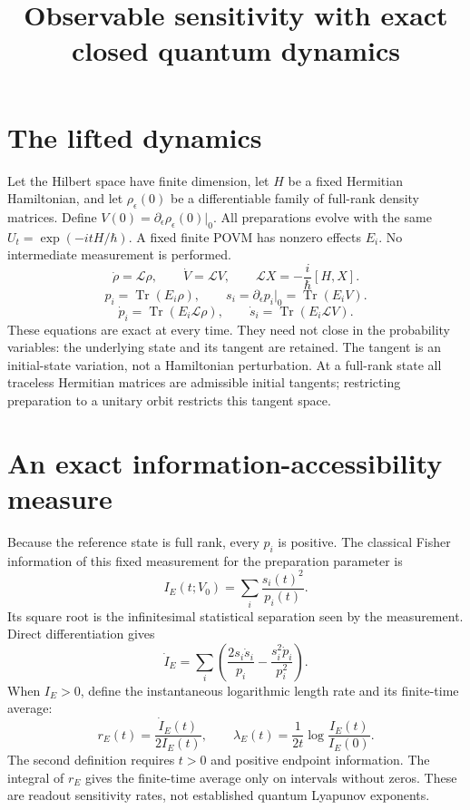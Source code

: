 \documentclass[11pt,a4paper]{article}
\newcommand{\Tr}{\operatorname{Tr}}
\begin{document}
\title{Observable sensitivity with exact closed quantum dynamics}
\author{}
\date{}
\maketitle
\section{The lifted dynamics}
Let the Hilbert space have finite dimension, let $H$ be a fixed Hermitian Hamiltonian, and let $\rho_\epsilon(0)$ be a differentiable family of full-rank density matrices. Define $V(0)=\partial_\epsilon\rho_\epsilon(0)|_0$. All preparations evolve with the same $U_t=\exp(-itH/\hbar)$. A fixed finite POVM has nonzero effects $E_i$. No intermediate measurement is performed.
\[\dot\rho=\mathcal L\rho,\qquad\dot V=\mathcal LV,\qquad\mathcal LX=-\frac{i}{\hbar}[H,X].\]
\[p_i=\Tr(E_i\rho),\qquad s_i=\partial_\epsilon p_i|_0=\Tr(E_iV).\]
\[\dot p_i=\Tr(E_i\mathcal L\rho),\qquad\dot s_i=\Tr(E_i\mathcal LV).\]
These equations are exact at every time. They need not close in the probability variables: the underlying state and its tangent are retained. The tangent is an initial-state variation, not a Hamiltonian perturbation. At a full-rank state all traceless Hermitian matrices are admissible initial tangents; restricting preparation to a unitary orbit restricts this tangent space.
\section{An exact information-accessibility measure}
Because the reference state is full rank, every $p_i$ is positive. The classical Fisher information of this fixed measurement for the preparation parameter is
\[I_E(t;V_0)=\sum_i\frac{s_i(t)^2}{p_i(t)}.\]
Its square root is the infinitesimal statistical separation seen by the measurement. Direct differentiation gives
\[\dot I_E=\sum_i\left(\frac{2s_i\dot s_i}{p_i}-\frac{s_i^2\dot p_i}{p_i^2}\right).\]
When $I_E>0$, define the instantaneous logarithmic length rate and its finite-time average:
\[r_E(t)=\frac{\dot I_E(t)}{2I_E(t)},\qquad\lambda_E(t)=\frac{1}{2t}\log\frac{I_E(t)}{I_E(0)}.\]
The second definition requires $t>0$ and positive endpoint information. The integral of $r_E$ gives the finite-time average only on intervals without zeros. These are readout sensitivity rates, not established quantum Lyapunov exponents.
\end{document}
